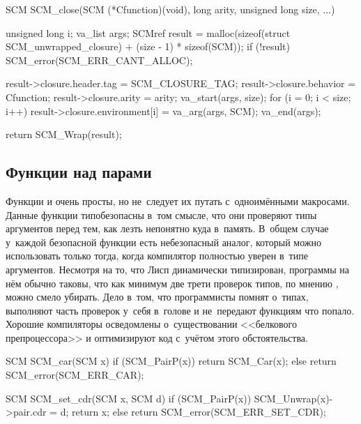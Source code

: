 \begin{code:c}
SCM SCM_close(SCM (*Cfunction)(void), long arity,
              unsigned long size, ...)
{
    unsigned long i;
    va_list args;
    SCMref result = malloc(sizeof(struct SCM_unwrapped_closure)
                           + (size - 1) * sizeof(SCM));
    if (!result)
    {
        SCM_error(SCM_ERR_CANT_ALLOC);
    }

    result->closure.header.tag = SCM_CLOSURE_TAG;
    result->closure.behavior   = Cfunction;
    result->closure.arity      = arity;
    va_start(args, size);
    for (i = 0; i < size; i++) {
        result->closure.environment[i] = va_arg(args, SCM);
    }
    va_end(args);
    
    return SCM_Wrap(result);
}
\end{code:c}


\subsection{Функции над парами}\label{cc/runtime/ssect:pairs}

Функции  и  очень просты, но не~следует их путать
с~одноимёнными макросами. Данные функции типобезопасны в~том смысле, что они
проверяют типы аргументов перед тем, как лезть непонятно куда в~память. В~общем
случае у~каждой безопасной функции есть небезопасный аналог, который можно
использовать только тогда, когда компилятор полностью уверен в~типе аргументов.
Несмотря на то, что Лисп динамически типизирован, программы на нём обычно
таковы, что как минимум две трети проверок типов, по мнению
\cite{hen92a,wc94,ser94}, можно смело убирать. Дело в~том, что программисты
помнят о~типах, выполняют часть проверок у~себя в~голове и не~передают функциям
что попало. Хорошие компиляторы осведомлены о~существовании <<белкового
препроцессора>> и оптимизируют код с~учётом этого обстоятельства.

\begin{code:c}
SCM SCM_car(SCM x)
{
    if (SCM_PairP(x)) {
        return SCM_Car(x);
    }
    else return SCM_error(SCM_ERR_CAR);
}

SCM SCM_set_cdr(SCM x, SCM d)
{
    if (SCM_PairP(x)) {
        SCM_Unwrap(x)->pair.cdr = d;
        return x;
    }
    else return SCM_error(SCM_ERR_SET_CDR);
}
\end{code:c}

